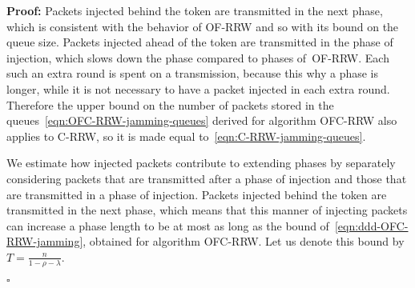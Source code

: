 \documentclass[11pt]{article}
\newcommand{\qed}{\hfill $\square$}
\newenvironment{proof}{\noindent\textbf{Proof: }}{\qed \smallbreak}
\begin{document}
\begin{proof}
Packets injected behind the token are transmitted in the next phase, which is consistent with the behavior of \textsc{OF-RRW} and so with its bound on the queue size.
Packets injected ahead of the token are transmitted in the phase of injection, which slows down the phase compared to phases of~\textsc{OF-RRW}.
Each such an extra round is spent on a  transmission, because this why a phase is longer, while it is not necessary to have a packet injected in each extra round.
Therefore the upper bound on the number of packets stored in the queues~\eqref{eqn:OFC-RRW-jamming-queues} derived for algorithm \textsc{OFC-RRW} also applies to \textsc{C-RRW}, so it is made equal to~\eqref{eqn:C-RRW-jamming-queues}.

We estimate how injected packets contribute to extending phases by separately considering  packets that are transmitted after a phase of injection and those that are transmitted in a phase of injection.
Packets injected behind the token are transmitted in the next phase, which means that this manner of injecting packets can increase a phase length to be at most as long as the bound of~\eqref{eqn:ddd-OFC-RRW-jamming}, obtained for algorithm \textsc{OFC-RRW}.
Let us denote this bound by $T=\frac{n}{1-\rho-\lambda}$.


\end{proof}
\end{document}
